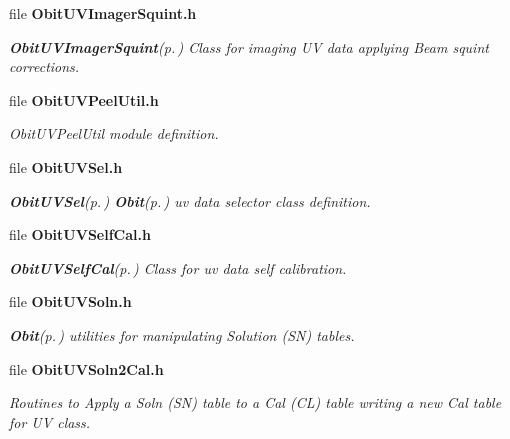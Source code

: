\begin{CompactItemize}
\item 
file {\bf Obit\-UVImager\-Squint.h}
\begin{CompactList}\small\item\em {\bf Obit\-UVImager\-Squint}{\rm (p.\,\pageref{structObitUVImagerSquint})} Class for imaging UV data applying Beam squint corrections. \item\end{CompactList}

\item 
file {\bf Obit\-UVPeel\-Util.h}
\begin{CompactList}\small\item\em Obit\-UVPeel\-Util module definition. \item\end{CompactList}

\item 
file {\bf Obit\-UVSel.h}
\begin{CompactList}\small\item\em {\bf Obit\-UVSel}{\rm (p.\,\pageref{structObitUVSel})} {\bf Obit}{\rm (p.\,\pageref{structObit})} uv data selector class definition. \item\end{CompactList}

\item 
file {\bf Obit\-UVSelf\-Cal.h}
\begin{CompactList}\small\item\em {\bf Obit\-UVSelf\-Cal}{\rm (p.\,\pageref{structObitUVSelfCal})} Class for uv data self calibration. \item\end{CompactList}

\item 
file {\bf Obit\-UVSoln.h}
\begin{CompactList}\small\item\em {\bf Obit}{\rm (p.\,\pageref{structObit})} utilities for manipulating Solution (SN) tables. \item\end{CompactList}

\item 
file {\bf Obit\-UVSoln2Cal.h}
\begin{CompactList}\small\item\em Routines to Apply a Soln (SN) table to a Cal (CL) table writing a new Cal table for UV class. \item\end{CompactList}


\end{CompactItemize}
